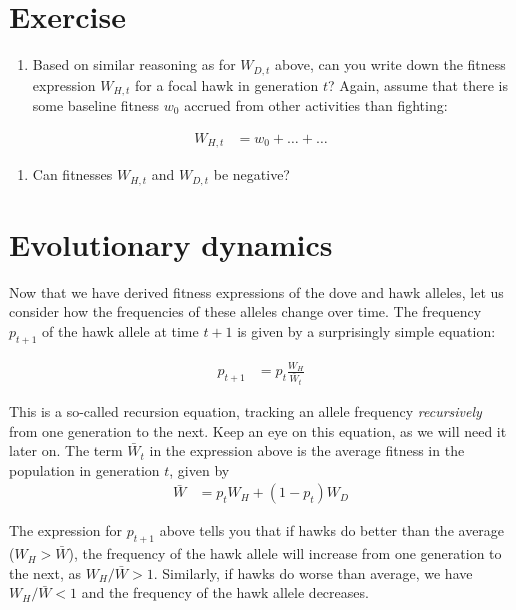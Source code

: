 \documentclass[
]{book}
\providecommand{\tightlist}{%
  \setlength{\itemsep}{0pt}\setlength{\parskip}{0pt}}
\begin{document}
\hypertarget{exercise-2}{%
\section{Exercise}\label{exercise-2}}

\begin{enumerate}
\def\labelenumi{\arabic{enumi}.}
\tightlist
\item
  Based on similar reasoning as for \(W_{D,t}\) above, can you write down the fitness expression \(W_{H,t}\) for a focal hawk in generation \(t\)? Again, assume that there is some baseline fitness \(w_{0}\) accrued from other activities than fighting:
\end{enumerate}

\begin{align}
W_{H,t} &= w_{0} + \ldots + \ldots
\end{align}

\begin{enumerate}
\def\labelenumi{\arabic{enumi}.}
\setcounter{enumi}{1}
\tightlist
\item
  Can fitnesses \(W_{H,t}\) and \(W_{D,t}\) be negative?
\end{enumerate}

\hypertarget{evolutionary-dynamics}{%
\section{Evolutionary dynamics}\label{evolutionary-dynamics}}

Now that we have derived fitness expressions of the dove and hawk alleles, let us consider how the frequencies of these alleles change over time. The frequency \(p_{t+1}\) of the hawk allele at time \(t+1\) is given by a surprisingly simple equation:

\begin{align}
p_{t+1} &= p_{t}  \frac{W_{H}}{\bar{W}_{t}}
\end{align}

This is a so-called recursion equation, tracking an allele frequency \emph{recursively} from one generation to the next. Keep an eye on this equation, as we will need it later on. The term \(\bar{W}_{t}\) in the expression above is the average fitness in the population in generation \(t\), given by
\begin{align}
\bar{W} &= p_{t} W_{H} + \left(1 - p_{t} \right ) W_{D}
\end{align}

The expression for \(p_{t+1}\) above tells you that if hawks do better than the average (\(W_{H} > \bar{W}\)), the frequency of the hawk allele will increase from one generation to the next, as \(W_{H}/\bar{W} > 1\). Similarly, if hawks do worse than average, we have \(W_{H}/\bar{W} < 1\) and the frequency of the hawk allele decreases.
\end{document}

